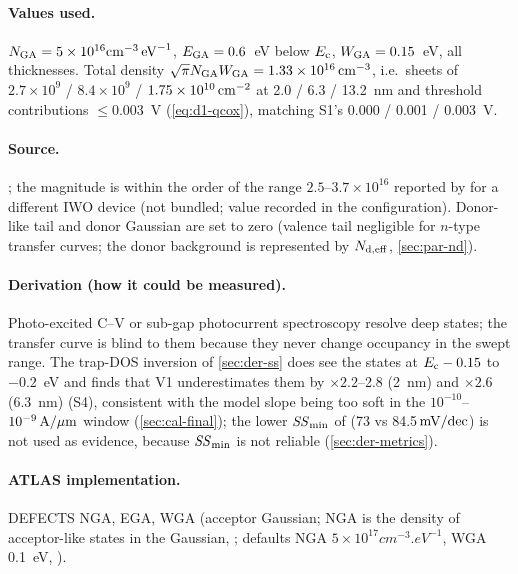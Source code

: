 \paragraph{Values used.}
$\NGA = 5\times10^{16}\si{cm^{-3}.eV^{-1}}$, $\EGA = 0.6$~eV below $\Ec$, $\WGA = 0.15$~eV, all thicknesses. Total
density $\sqrt{\pi}\NGA\WGA = 1.33\times10^{16}\cmcu$, i.e.\ sheets of $2.7\times10^{9}$ / $8.4\times10^{9}$ /
$1.75\times10^{10}\cmsq$ at 2.0 / 6.3 / 13.2~nm and threshold contributions $\le 0.003$~V (\cref{eq:d1-qcox}),
matching S1's 0.000 / 0.001 / 0.003~V.

\paragraph{Source.}
; the magnitude is within the order of the range $2.5$--$3.7\times10^{16}$ reported by \citet{Fan2021}
for a different IWO device (not bundled; value recorded in the configuration). Donor-like tail and donor Gaussian
are set to zero (valence tail negligible for $n$-type transfer curves; the donor background is represented by
$\Ndeff$, \cref{sec:par-nd}).

\paragraph{Derivation (how it could be measured).}
Photo-excited C--V or sub-gap photocurrent spectroscopy resolve deep states; the transfer curve is blind to them
because they never change occupancy in the swept range. The trap-DOS inversion of \cref{sec:der-ss} does see the
states at $\Ec-0.15$ to $-0.2$~eV and finds that V1 underestimates them by $\times2.2$--2.8 (2~nm) and $\times2.6$
(6.3~nm) (S4), consistent with the model slope being too soft in the $10^{-10}$--$10^{-9}\Aum$ window
(\cref{sec:cal-final}); the lower $\SSmin$ of  (73 vs 84.5$\mVdec$) is not used as evidence, because
$\SSmin$ is not reliable (\cref{sec:der-metrics}).

\paragraph{ATLAS implementation.}
DEFECTS NGA, EGA, WGA (acceptor Gaussian; NGA is the density of acceptor-like states in the Gaussian,
\citealp[p.~1171]{AtlasManual}; defaults NGA $5\times10^{17}\si{cm^{-3}.eV^{-1}}$, WGA 0.1~eV,
\citealp[pp.~1168--1169]{AtlasManual}).

